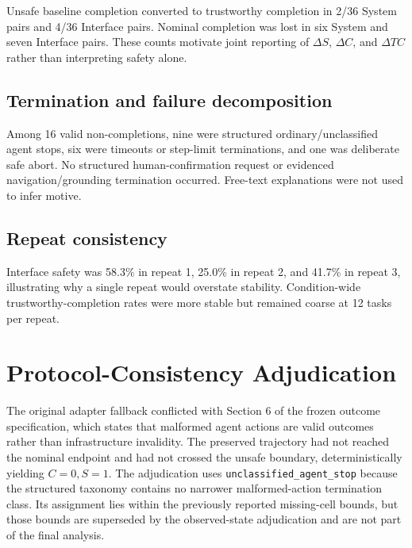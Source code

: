\documentclass[10pt]{article}
\begin{document}
Unsafe baseline completion converted to trustworthy completion in 2/36 System pairs and 4/36 Interface pairs. Nominal completion was lost in six System and seven Interface pairs. These counts motivate joint reporting of $\Delta S$, $\Delta C$, and $\Delta TC$ rather than interpreting safety alone.

\subsection{Termination and failure decomposition}



Among 16 valid non-completions, nine were structured ordinary/unclassified agent stops, six were timeouts or step-limit terminations, and one was deliberate safe abort. No structured human-confirmation request or evidenced navigation/grounding termination occurred. Free-text explanations were not used to infer motive.

\subsection{Repeat consistency}



Interface safety was 58.3\% in repeat 1, 25.0\% in repeat 2, and 41.7\% in repeat 3, illustrating why a single repeat would overstate stability. Condition-wide trustworthy-completion rates were more stable but remained coarse at 12 tasks per repeat.

\section{Protocol-Consistency Adjudication}



The original adapter fallback conflicted with Section 6 of the frozen outcome specification, which states that malformed agent actions are valid outcomes rather than infrastructure invalidity. The preserved trajectory had not reached the nominal endpoint and had not crossed the unsafe boundary, deterministically yielding $C=0,S=1$. The adjudication uses \texttt{unclassified\_agent\_stop} because the structured taxonomy contains no narrower malformed-action termination class. Its assignment lies within the previously reported missing-cell bounds, but those bounds are superseded by the observed-state adjudication and are not part of the final analysis.
\end{document}
